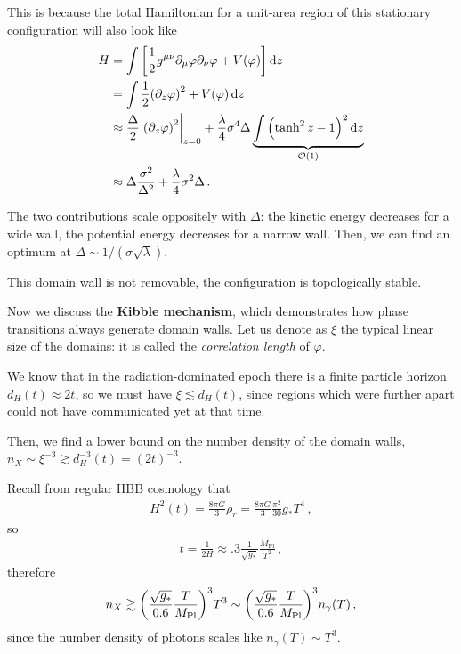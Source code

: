\documentclass[main.tex]{subfiles}
\begin{document}
This is because the total Hamiltonian for a unit-area region of this stationary configuration will also look like 
%
\begin{align}
H &= \int \qty[\frac{1}{2} g^{\mu \nu } \partial_{\mu } \varphi \partial_{\nu } \varphi + V(\varphi ) ] \dd{z}  \\
&= \int \frac{1}{2} \qty(\partial_{z} \varphi )^2 + V(\varphi ) \dd{z}  \\
&\approx \frac{\Delta}{2} \eval{\qty(\partial_{z} \varphi)^2}_{z=0} + \frac{\lambda}{4} \sigma^4 \Delta  \underbrace{\int \qty(\tanh^2 z - 1)^2 \dd{z}}_{\order{1}}   \\
&\approx \Delta \frac{\sigma^2}{\Delta^2} + \frac{\lambda}{4} \sigma^2 \Delta 
\,.
\end{align}


The two contributions scale oppositely with \(\Delta \): the kinetic energy decreases for a wide wall, the potential energy decreases for a narrow wall. 
Then, we can find an optimum at \(\Delta \sim 1 / (\sigma \sqrt{\lambda })\). 

This domain wall is not removable, the configuration is topologically stable. 

Now we discuss the \textbf{Kibble mechanism}, which demonstrates how phase transitions always generate domain walls. 
Let us denote as \(\xi \) the typical linear size of the domains: it is called the \emph{correlation length} of \(\varphi \). 

We know that in the radiation-dominated epoch there is a finite particle horizon \(d_H(t) \approx 2 t\), so we must have \(\xi \lesssim d_H (t)\), since regions which were further apart could not have communicated yet at that time. 

Then, we find a lower bound on the number density of the domain walls, \(n_X \sim \xi^{-3} \gtrsim d_H^{-3}(t) = (2t)^{-3}\). 

Recall from regular HBB cosmology that 
%
\begin{align}
H^2(t) = \frac{8 \pi G}{3} \rho _r = \frac{8 \pi G}{3} \frac{\pi^2}{30} g_* T^{4}
\,,
\end{align}
%
so 
%
\begin{align}
t = \frac{1}{2 H} \approx \num{.3} \frac{1}{\sqrt{g_*}} \frac{M _{\text{Pl}}}{T^2}
\,,
\end{align}
%
therefore 
%
\begin{align}
n_X \gtrsim \qty(\frac{\sqrt{g_*}}{\num{.6}} \frac{T}{M _{\text{Pl}}})^3 T^3 \sim \qty(\frac{\sqrt{g_*}}{\num{.6}} \frac{T}{ M _{\text{Pl}}})^3 n_\gamma (T)
\,,
\end{align}
%
since the number density of photons scales like \(n_\gamma (T) \sim T^3\).
\end{document}

